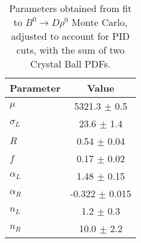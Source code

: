 \begin{table}[h]
  \centering
  \begin{tabular}{lc}
      \toprule
      Parameter & Value \\
      \midrule
      $\mu$ & 5321.3 $\pm$ 0.5 \\
      $\sigma_L$ & 23.6 $\pm$ 1.4 \\
      $R$ & 0.54 $\pm$ 0.04 \\
      $f$ & 0.17 $\pm$ 0.02 \\
      $\alpha_L$ & 1.48 $\pm$ 0.15 \\
      $\alpha_R$ & -0.322 $\pm$ 0.015 \\
      $n_L$ & 1.2 $\pm$ 0.3 \\
      $n_R$ & 10.0 $\pm$ 2.2 \\
  \bottomrule
  \end{tabular}
  \caption{Parameters obtained from fit to $B^0 \to D\rho^0$ Monte  Carlo, adjusted to account for PID cuts, with the sum of two Crystal Ball PDFs.}
\label{tab:rho_mc_params}
\end{table}
